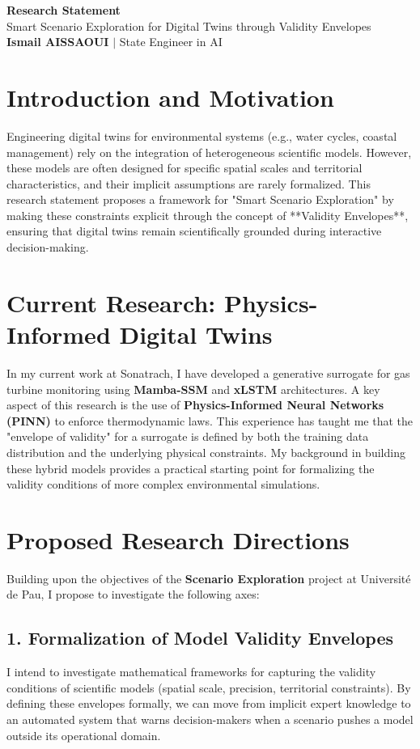 \documentclass[a4paper,11pt]{article}
\begin{document}
\begin{center}
    {\LARGE\bfseries\color{titleblue} Research Statement}\\[6pt]
    {\large Smart Scenario Exploration for Digital Twins through Validity Envelopes}\\[4pt]
    \textbf{Ismail AISSAOUI} $|$ State Engineer in AI
\end{center}

\bigskip

\section{Introduction and Motivation}
Engineering digital twins for environmental systems (e.g., water cycles, coastal management) rely on the integration of heterogeneous scientific models. However, these models are often designed for specific spatial scales and territorial characteristics, and their implicit assumptions are rarely formalized. This research statement proposes a framework for "Smart Scenario Exploration" by making these constraints explicit through the concept of **Validity Envelopes**, ensuring that digital twins remain scientifically grounded during interactive decision-making.

\section{Current Research: Physics-Informed Digital Twins}
In my current work at Sonatrach, I have developed a generative surrogate for gas turbine monitoring using \textbf{Mamba-SSM} and \textbf{xLSTM} architectures. A key aspect of this research is the use of \textbf{Physics-Informed Neural Networks (PINN)} to enforce thermodynamic laws. This experience has taught me that the "envelope of validity" for a surrogate is defined by both the training data distribution and the underlying physical constraints. My background in building these hybrid models provides a practical starting point for formalizing the validity conditions of more complex environmental simulations.

\section{Proposed Research Directions}
Building upon the objectives of the \textbf{Scenario Exploration} project at Université de Pau, I propose to investigate the following axes:

\subsection{1. Formalization of Model Validity Envelopes}
I intend to investigate mathematical frameworks for capturing the validity conditions of scientific models (spatial scale, precision, territorial constraints). By defining these envelopes formally, we can move from implicit expert knowledge to an automated system that warns decision-makers when a scenario pushes a model outside its operational domain.
\end{document}
